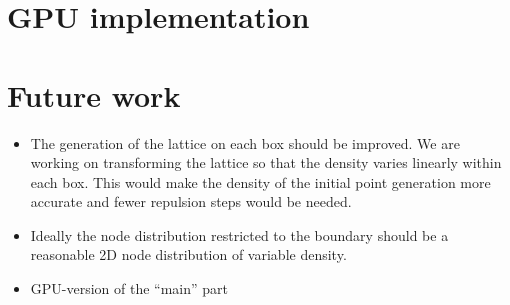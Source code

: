 \documentclass[10pt]{amsart}
\begin{document}
\section{GPU implementation}



\section{Future work}
\begin{itemize}
\item The generation of the lattice on each box should be improved. We are working on transforming the lattice so that the density varies linearly within each box. This would make the density of the initial point generation more accurate and fewer repulsion steps would be needed.
\item Ideally the node distribution restricted to the boundary should be a reasonable 2D node distribution of variable density.
\item GPU-version of the ``main'' part \cite{Recipes1989}
\end{itemize}



\end{document}
